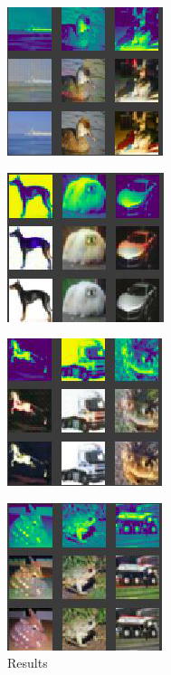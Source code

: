 \documentclass[conference]{IEEEtran}
\begin{document}
\begin{figure}[h]
\centerline{\includegraphics{res1}}
\label{fig}
\end{figure}
\begin{figure}[h]
\centerline{\includegraphics{res2}}
\label{fig}
\end{figure}
\begin{figure}[h]
\centerline{\includegraphics{res3}}
\label{fig}
\end{figure}
\begin{figure}[h]
\centerline{\includegraphics{res4}}
\caption{Results}
\label{fig}
\end{figure}
\end{document}
